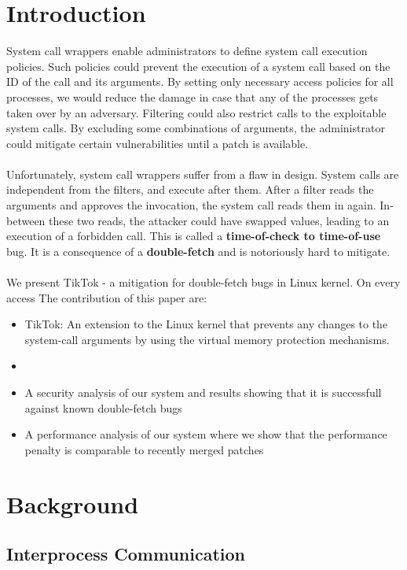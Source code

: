 \documentclass[conference]{IEEEtran}
\begin{document}
\section{Introduction}
System call wrappers enable administrators to define system call execution policies. Such policies could prevent the execution of a system call based
on the ID of the call and its arguments. By setting only necessary access policies for all processes, we would reduce the damage in case that any of 
the processes gets taken over by an adversary. 
Filtering could also restrict calls to the exploitable system calls. By excluding some combinations of arguments, the administrator could mitigate
certain vulnerabilities until a patch is available.
\\
\\
Unfortunately, system call wrappers suffer from a flaw in design. System calls are independent from the filters, and execute after them. After a filter
reads the arguments and approves the invocation, the system call reads them in again. In-between these two reads, the attacker could have swapped values,
leading to an execution of a forbidden call. This is called a \textbf{time-of-check to time-of-use} bug. It is a consequence of a \textbf{double-fetch} and
is notoriously hard to mitigate.
\\
\\
We present TikTok - a mitigation for double-fetch bugs in Linux kernel. On every access
The contribution of this paper are:
\begin{itemize}
\item TikTok: An extension to the Linux kernel that prevents any changes to the system-call arguments by using the virtual memory protection mechanisms.
\item 
\item A security analysis of our system and results showing that it is successfull against known double-fetch bugs
\item A performance analysis of our system where we show that the performance penalty is comparable to recently merged patches
\end{itemize}

\section{Background}


\subsection{Interprocess Communication}
\end{document}
